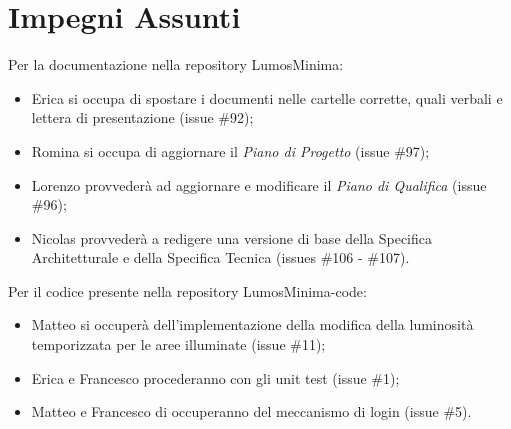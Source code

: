 \documentclass[a4paper, 12pt]{article}
\begin{document}
\section*{Impegni Assunti}

Per la documentazione nella repository LumosMinima:
\begin{itemize}
    \item Erica si occupa di spostare i documenti nelle cartelle corrette, quali verbali e lettera di presentazione (issue \#92);
    \item Romina si occupa di aggiornare il \textit{Piano di Progetto} (issue \#97);
    \item Lorenzo provvederà ad aggiornare e modificare il \textit{Piano di Qualifica} (issue \#96);
    \item Nicolas provvederà a redigere una versione di base della Specifica Architetturale e della Specifica Tecnica (issues \#106 - \#107).
\end{itemize}

Per il codice presente nella repository LumosMinima-code:
\begin{itemize}
    \item Matteo si occuperà dell'implementazione della modifica della luminosità temporizzata per le aree illuminate (issue \#11);
    \item Erica e Francesco procederanno con gli unit test (issue \#1);
    \item Matteo e Francesco di occuperanno del meccanismo di login (issue \#5).
\end{itemize}
\end{document}
